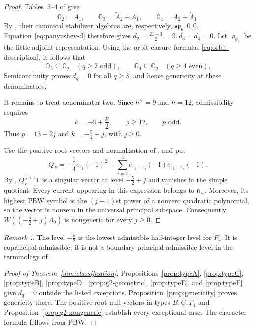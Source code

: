 \documentclass[11pt]{amsart}
\theoremstyle{definition}
\theoremstyle{remark}
\newtheorem{remark}[theorem]{Remark}
\begin{document}
\begin{proof}
Tables~3--4 of \cite{AvEM} give
\[
 \mathbb O_2=A_1,\qquad
 \mathbb O_3=\widetilde A_2+A_1,\qquad
 \mathbb O_4=A_2+\widetilde A_1.
\]
By \cite[Theorem~6.1 and Table~1]{Pan}, their canonical
stabilizer algebras are, respectively,
$
 \mathfrak{sp}_6, 0, 0.
$
Equation~\eqref{eq:panyushev-d} therefore gives
$
 d_2=\frac{21-3}{2}=9, d_3=d_4=0.
$
Let $\varrho_{\theta_s}$ be the little adjoint representation.
Using the orbit-closure formulas 
\eqref{eq:orbit-description},
it follows that
\[
 \overline{\mathbb O_3}\subseteq\overline{\mathbb O_q}
 \quad(q\ge3\text{ odd}),\qquad
 \overline{\mathbb O_4}\subseteq\overline{\mathbb O_q}
 \quad(q\ge4\text{ even}).
\]
Semicontinuity proves $d_q=0$ for all $q\ge3$, and hence
genericity at these denominators.

It remains to treat denominator two.
Since $h^\vee=9$ and $h=12$, admissibility requires
\[
 k=-9+\frac p2,\qquad p\ge12,\qquad p\text{ odd}.
\]
Thus $p=13+2j$ and $k=-\frac52+j$, with $j\ge0$.

Use the positive-root vectors and normalization of \cite{PerseF},
and put
\[
 Q_F=-\frac14e_{\varepsilon_1}(-1)^2
 +\sum_{i=2}^{4}
 e_{\varepsilon_1-\varepsilon_i}(-1)
 e_{\varepsilon_1+\varepsilon_i}(-1).
\]
By \cite[Lemma~4.10 and Theorem~4.11]{PerseF},
$Q_F^{\,j+1}\mathbf1$ is a singular vector at level
$-\frac52+j$ and vanishes in the simple quotient.
Every current appearing in this expression belongs to
$\mathfrak n_+$. Moreover, its highest PBW symbol is the
$(j+1)$st power of a nonzero quadratic polynomial, so the vector
is nonzero in the universal principal subspace.
Consequently $W((-\frac52+j)\Lambda_0)$ is nongeneric for every $j\ge0$.
\end{proof}

\begin{remark}
The level $-\frac52$ is the lowest admissible half-integer level
for $F_4$. It is coprincipal admissible; it is not a boundary
principal admissible level in the terminology of \cite{KW}.
\end{remark}

\begin{proof}[Proof of Theorem~\ref{thm:classification}]
Propositions~\ref{prop:typeA}, \ref{prop:typeC}, \ref{prop:typeB},
\ref{prop:typeD}, \ref{prop:g2-geometric}, \ref{prop:typeE}, and
\ref{prop:typeF} give $d_q=0$ outside the listed exceptions.
Proposition~\ref{prop:genericity} proves genericity there.
The positive-root null vectors in types $B,C,F_4$ and
Proposition~\ref{prop:g2-nongeneric} establish every exceptional case.
The character formula follows from PBW.
\end{proof}
\end{document}

